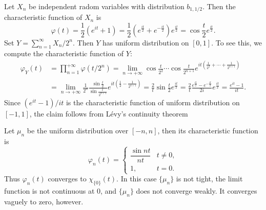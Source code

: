 \begin{example}
Let $X_n$ be independent radom variables with distribution $b_{1,1/2}$. Then the characteristic function of $X_n$ is
\[\varphi(t)=\frac{1}{2}(e^{it}+1)=\frac{1}{2}(e^{\frac{it}{2}}+e^{-\frac{it}{2}})e^{\frac{it}{2}}=\cos\frac{t}{2}e^{\frac{it}{2}}.\]
Set $Y=\sum_{n=1}^{\infty}X_n/2^n$. Then $Y$ has uniform distribution on $[0,1]$. To see this, we compute the characteristic function of $Y$:
\begin{align*}
\varphi_Y(t)&=\prod_{n=1}^{+\infty}\varphi(t/2^n)=\lim_{n\to+\infty}\cos\frac{t}{2^2}\cdots\cos\frac{t}{2^{n+1}}e^{it(\frac{1}{2^2}+\cdots+\frac{1}{2^{n+1}})}\\
&=\lim_{n\to+\infty}\frac{1}{2^n}\frac{\sin\frac{t}{2}}{\sin\frac{t}{2^{n+1}}}e^{it(\frac{1}{2}-\frac{1}{2^{n+1}})}=\frac{2}{t}\sin\frac{t}{2}e^{\frac{it}{2}}=\frac{2}{t}\frac{e^{\frac{it}{2}}-e^{-\frac{it}{2}}}{2i}e^{\frac{it}{2}}=\frac{e^{it}-1}{it}.
\end{align*}
Since $(e^{it}-1)/it$ is the characteristic function of uniform distribution on $[-1,1]$, the claim follows from L\'evy's continuity theorem
\end{example}
\begin{example}
Let $\mu_n$ be the uniform distribution over $[-n,n]$, then its characteristic function is 
\[\varphi_n(t)=\begin{cases}
\dfrac{\sin nt}{nt}&t\neq 0,\\[8pt]
1,&t=0.
\end{cases}\]
Thus $\varphi_n(t)$ converges to $\chi_{\{0\}}(t)$. In this case $\{\mu_n\}$ is not tight, the limit function is not continuous at $0$, and $\{\mu_n\}$ does not converge weakly. It converges vaguely to zero, however.
\end{example}
